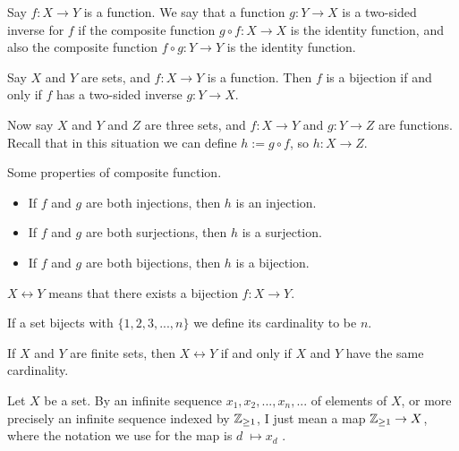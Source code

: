 \documentclass[a4paper]{article}
\begin{document}
\begin{defi}
Say $f : X \to Y$ is a function. We say that a function $g : Y \to X$ is a two-sided inverse for $f$ if the composite function $g \circ f : X \to X$ is the identity function, and also the composite function $f \circ g : Y \to Y$ is the identity function.
\end{defi}

\begin{thm}
Say $X$ and $Y$ are sets, and $f :X \to Y$ is a function. Then $f$ is a bijection if and only if $f$ has a two-sided inverse $g:Y \to X$.
\end{thm}

Now say $X$ and $Y$ and $Z$ are three sets, and $f : X \to Y$ and $g : Y \to Z$ are functions. Recall that in this situation we can define $h := g \circ f$, so $h : X \to Z$.

\begin{thm}
Some properties of composite function.
\begin{itemize}
	\item If $f$ and $g$ are both injections, then $h$ is an injection.
	\item If $f$ and $g$ are both surjections, then $h$ is a surjection.
	\item If $f$ and $g$ are both bijections, then $h$ is a bijection.
\end{itemize}
\end{thm}

\begin{defi}
$X \leftrightarrow Y$ means that there exists a bijection $f : X \to Y$.
\end{defi}

\begin{defi}
If a set bijects with $\{1, 2, 3, ... , n\}$ we define its cardinality to be $n$.
\end{defi}

\begin{thm}
If $X$ and $Y$ are finite sets, then $X \leftrightarrow Y$ if and only if $X$ and $Y$ have the same cardinality.
\end{thm}

\begin{defi}
Let $X$ be a set. By an infinite sequence $x_1,x_2,...,x_n,...$ of elements of $X$, or more precisely an infinite sequence indexed by $\mathbb{Z}_{\geq 1}$, I just mean a map $\mathbb{Z}_{\geq 1} \to X$, where the notation we use for the map is $d 􏰜\mapsto x_d$ .
\end{defi}
\end{document}
